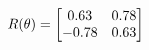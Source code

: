 \documentclass[preview]{standalone}
\begin{document}
\begin{align*}
\special{dvisvgm:raw <g id='unique000'>}R(\theta) = \begin{bmatrix}0.63 & 0.78\\-0.78 & 0.63\end{bmatrix}\special{dvisvgm:raw </g>}
\end{align*}
\end{document}
